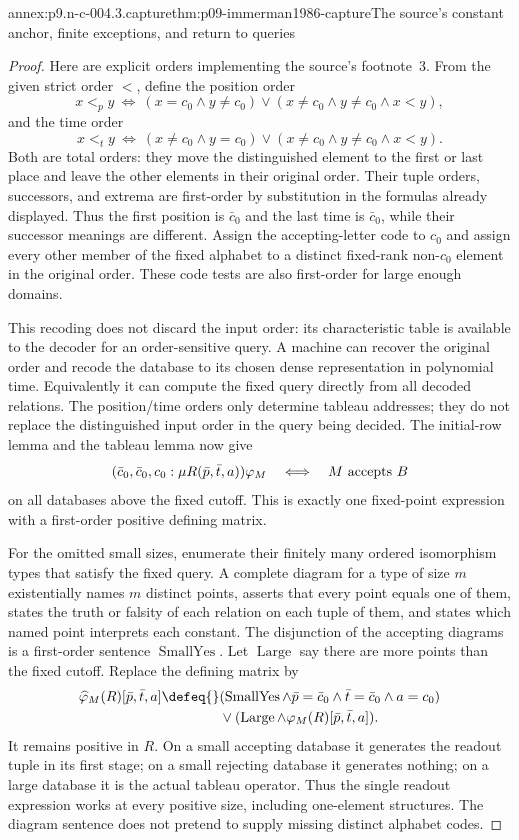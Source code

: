 \begin{annexitem}{annex:p9.n-c-004.3.capture}{thm:p09-immerman1986-capture}{The source's constant anchor, finite exceptions, and return to queries}
\begin{proof}
Here are explicit orders implementing the source's footnote~3.  From
the given strict order \(<\), define the position order
\[
 x<_p y\ \Longleftrightarrow\
 (x=c_0\land y\ne c_0)\lor
 (x\ne c_0\land y\ne c_0\land x<y),
\]
and the time order
\[
 x<_t y\ \Longleftrightarrow\
 (x\ne c_0\land y=c_0)\lor
 (x\ne c_0\land y\ne c_0\land x<y).
\]
Both are total orders: they move the distinguished element to the first
or last place and leave the other elements in their original order.
Their tuple orders, successors, and extrema are first-order by substitution
in the formulas already displayed.  Thus the first position is
\(\bar c_0\) and the last time is \(\bar c_0\), while their
successor meanings are different.  Assign the accepting-letter code to
\(c_0\) and assign every other member of the fixed alphabet to a
distinct fixed-rank non-\(c_0\) element in the original order.
These code tests are also first-order for large enough domains.

This recoding does not discard the input order: its characteristic
table is available to the decoder for an order-sensitive query.
A machine can recover the original order and recode the database to
its chosen dense representation in polynomial time.  Equivalently it
can compute the fixed query directly from all decoded relations.
The position/time orders only determine tableau addresses; they do
not replace the distinguished input order in the query being decided.
The initial-row lemma and the tableau lemma now give
\[
 (\bar c_0,\bar c_0,c_0:\mu R(\bar p,\bar t,a))\varphi_M
 \quad\Longleftrightarrow\quad M\hbox{ accepts }B
\]
on all databases above the fixed cutoff.  This is exactly one
fixed-point expression with a first-order positive defining matrix.

For the omitted small sizes, enumerate their finitely many ordered
isomorphism types that satisfy the fixed query.  A complete diagram
for a type of size \(m\) existentially names \(m\) distinct
points, asserts that every point equals one of them, states the truth
or falsity of each relation on each tuple of them, and states which
named point interprets each constant.  The disjunction of the accepting
diagrams is a first-order sentence \(\operatorname{SmallYes}\).
Let \(\operatorname{Large}\) say there are more points than the
fixed cutoff.  Replace the defining matrix by
\[
\begin{split}
 \widehat\varphi_M(R)[\bar p,\bar t,a]\defeq{}&
  (\operatorname{SmallYes}\land\bar p=\bar c_0
     \land\bar t=\bar c_0\land a=c_0)\\
 &{}\lor(\operatorname{Large}\land\varphi_M(R)[\bar p,\bar t,a]).
\end{split}
\]
It remains positive in \(R\).  On a small accepting database it
generates the readout tuple in its first stage; on a small rejecting
database it generates nothing; on a large database it is the actual
tableau operator.  Thus the single readout expression works at every
positive size, including one-element structures.  The diagram sentence
does not pretend to supply missing distinct alphabet codes.


\end{proof}
\end{annexitem}
